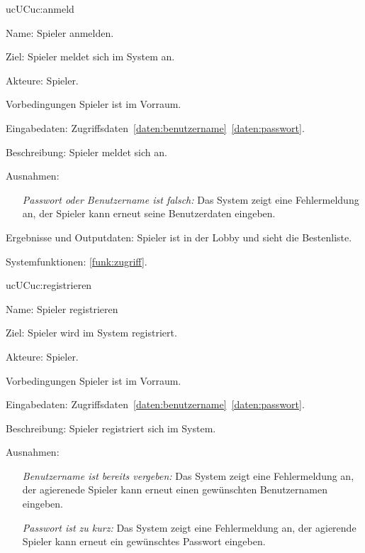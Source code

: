\begin{description}[leftmargin=5em, style=sameline]
	\begin{lhp}{uc}{UC}{uc:anmeld}
		\item [Name:] Spieler anmelden.
		\item [Ziel:] Spieler meldet sich im System an.
		\item [Akteure:] Spieler.
		\item [Vorbedingungen] Spieler ist im Vorraum.
		\item [Eingabedaten:] Zugriffsdaten~\ref{daten:benutzername}~\ref{daten:passwort}.
		\item [Beschreibung:] Spieler meldet sich an.							
		\item [Ausnahmen:] \hfill
			\begin{itemize} 
				\item[] \textit{Passwort oder Benutzername ist falsch:} Das System zeigt eine Fehlermeldung an, der Spieler kann erneut seine Benutzerdaten eingeben.
				
			\end{itemize}
		\item [Ergebnisse und Outputdaten:] Spieler ist in der Lobby und sieht die Bestenliste.	
		\item [Systemfunktionen:] \ref{funk:zugriff}.
	\end{lhp}
	
	\begin{lhp}{uc}{UC}{uc:registrieren}
		\item [Name:] Spieler registrieren
		\item [Ziel:] Spieler wird im System registriert.
		\item [Akteure:] Spieler.
		\item [Vorbedingungen] Spieler ist im Vorraum.
		\item [Eingabedaten:] Zugriffsdaten~\ref{daten:benutzername}~\ref{daten:passwort}.
		\item [Beschreibung:] Spieler registriert sich im System.							
		\item [Ausnahmen:] \hfill
			\begin{itemize} 
				\item[] \textit{Benutzername ist bereits vergeben:} Das System zeigt eine Fehlermeldung an, der agierenede Spieler kann erneut einen gewünschten Benutzernamen eingeben.
				
				\item[] \textit{Passwort ist zu kurz:} Das System zeigt eine Fehlermeldung an, der agierende Spieler kann erneut ein gewünschtes Passwort eingeben.
				

\end{itemize}
\end{lhp}
\end{description}
